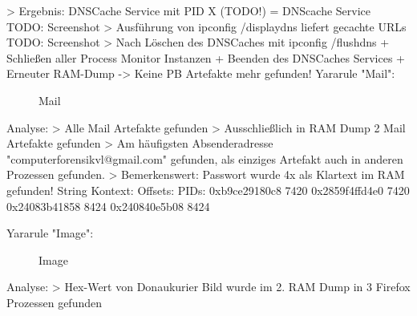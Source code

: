 		> Ergebnis: DNSCache Service mit PID X (TODO!) = DNScache Service
			TODO: Screenshot
		> Ausführung von ipconfig /displaydns liefert gecachte URLs
			TODO: Screenshot
		> Nach Löschen des DNSCaches mit ipconfig /flushdns + Schließen aller Process Monitor Instanzen + Beenden des DNSCaches Services + Erneuter RAM-Dump -> Keine PB Artefakte mehr gefunden!
Yararule "Mail":
	\begin{figure}[h!]
		\centerline{}
		\label{chart:final-criteria}  
		\caption{Mail}
	\end{figure}
	Analyse:
		> Alle Mail Artefakte gefunden
		> Ausschließlich in RAM Dump 2 Mail Artefakte gefunden
		> Am häufigsten Absenderadresse "computerforensikvl@gmail.com" gefunden, als einziges Artefakt auch in anderen Prozessen gefunden.
		> Bemerkenswert: Passwort wurde 4x als Klartext im RAM gefunden!
			String Kontext:
				Offsets:		PIDs:
				0xb9ce29180c8	7420
				0x2859f4ffd4e0	7420
				0x24083b41858	8424
				0x240840e5b08	8424
				
Yararule "Image":
	\begin{figure}[h!]
		\centerline{}
		\label{chart:final-criteria}  
		\caption{Image}
	\end{figure}
	Analyse:
		> Hex-Wert von Donaukurier Bild wurde im 2. RAM Dump in 3 Firefox Prozessen gefunden
	

